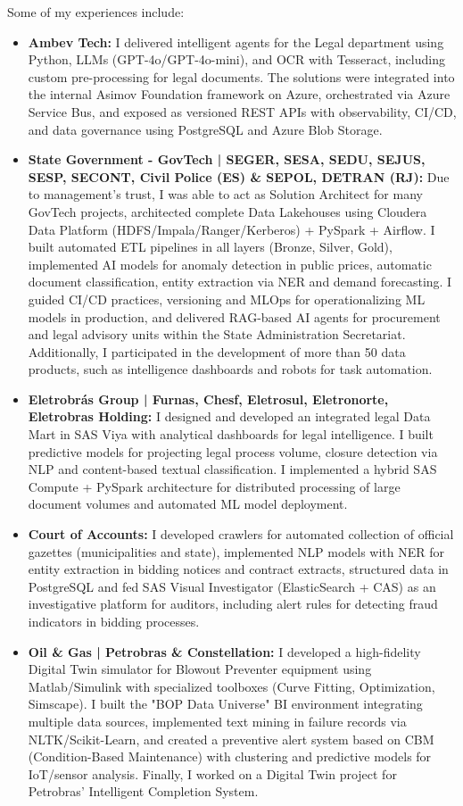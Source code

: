 \begin{cvparagraph}
Some of my experiences include:
\begin{itemize}
  \item \textbf{Ambev Tech:} I delivered intelligent agents for the Legal department using Python, LLMs (GPT-4o/GPT-4o-mini), and OCR with Tesseract, including custom pre-processing for legal documents. The solutions were integrated into the internal Asimov Foundation framework on Azure, orchestrated via Azure Service Bus, and exposed as versioned REST APIs with observability, CI/CD, and data governance using PostgreSQL and Azure Blob Storage.
  \item \textbf{State Government - GovTech | SEGER, SESA, SEDU, SEJUS, SESP, SECONT, Civil Police (ES) \& SEPOL, DETRAN (RJ):} Due to management's trust, I was able to act as Solution Architect for many GovTech projects, architected complete Data Lakehouses using Cloudera Data Platform (HDFS/Impala/Ranger/Kerberos) + PySpark + Airflow. I built automated ETL pipelines in all layers (Bronze, Silver, Gold), implemented AI models for anomaly detection in public prices, automatic document classification, entity extraction via NER and demand forecasting. I guided CI/CD practices, versioning and MLOps for operationalizing ML models in production, and delivered RAG-based AI agents for procurement and legal advisory units within the State Administration Secretariat. Additionally, I participated in the development of more than 50 data products, such as intelligence dashboards and robots for task automation.
  \item \textbf{Eletrobrás Group | Furnas, Chesf, Eletrosul, Eletronorte, Eletrobras Holding:} I designed and developed an integrated legal Data Mart in SAS Viya with analytical dashboards for legal intelligence. I built predictive models for projecting legal process volume, closure detection via NLP and content-based textual classification. I implemented a hybrid SAS Compute + PySpark architecture for distributed processing of large document volumes and automated ML model deployment.
  \item \textbf{Court of Accounts:} I developed crawlers for automated collection of official gazettes (municipalities and state), implemented NLP models with NER for entity extraction in bidding notices and contract extracts, structured data in PostgreSQL and fed SAS Visual Investigator (ElasticSearch + CAS) as an investigative platform for auditors, including alert rules for detecting fraud indicators in bidding processes.
  \item \textbf{Oil \& Gas | Petrobras \& Constellation:} I developed a high-fidelity Digital Twin simulator for Blowout Preventer equipment using Matlab/Simulink with specialized toolboxes (Curve Fitting, Optimization, Simscape). I built the "BOP Data Universe" BI environment integrating multiple data sources, implemented text mining in failure records via NLTK/Scikit-Learn, and created a preventive alert system based on CBM (Condition-Based Maintenance) with clustering and predictive models for IoT/sensor analysis. Finally, I worked on a Digital Twin project for Petrobras' Intelligent Completion System.
\end{itemize}


\end{cvparagraph}
